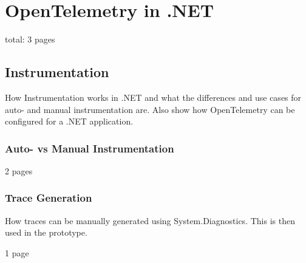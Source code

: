 \chapter{OpenTelemetry in .NET}
\label{chap:dotnet}

total: 3 pages

\section{Instrumentation}
\label{sec:d_instrumentation}

How Instrumentation works in .NET and what the differences and use cases for auto- and manual instrumentation are.
Also show how OpenTelemetry can be configured for a .NET application.

\subsection{Auto- vs Manual Instrumentation}

2 pages

\subsection{Trace Generation}
\label{sec:d_trace_generation}

How traces can be manually generated using System.Diagnostics. This is then used in the prototype.

1 page
